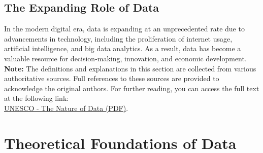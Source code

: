 \documentclass[12pt, oneside]{book}
\begin{document}
\subsection{The Expanding Role of Data}
In the modern digital era, data is expanding at an unprecedented rate due to advancements in technology, including the proliferation of internet usage, artificial intelligence, and big data analytics. As a result, data has become a valuable resource for decision-making, innovation, and economic development.
\vspace{0.5cm}\\
\textbf{Note:} The definitions and explanations in this section are collected from various authoritative sources. Full references to these sources are provided to acknowledge the original authors. For further reading, you can access the full text at the following link: \\
 \href{https://egyankosh.ac.in/bitstream/123456789/10935/3/Unit-2.pdf}{UNESCO - The Nature of Data (PDF)}.

\section{Theoretical Foundations of Data}
\end{document}
